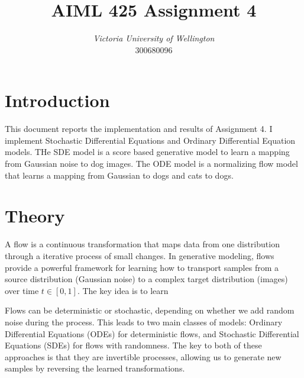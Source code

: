 \documentclass[conference,a4paper]{IEEEtran}
\begin{document}
\title{AIML 425 Assignment 4 %
}

\author{
\textit{Victoria University of Wellington}\\
300680096}


\maketitle

\section{Introduction}

This document reports the implementation and results of Assignment 4. I implement Stochastic Differential Equations and Ordinary Differential Equation models. THe SDE model is a score based generative model to learn a mapping from Gaussian noise to dog images. The ODE model is a normalizing flow model that learns a mapping from Gaussian to dogs and cats to dogs.

\section{Theory}

A flow is a continuous transformation that maps data from one distribution through a iterative process of small changes. In generative modeling, flows provide a powerful framework for learning how to transport samples from a source distribution (Gaussian noise) to a complex target distribution (images) over time $t \in [0, 1]$. The key idea is to learn 

Flows can be deterministic or stochastic, depending on whether we add random noise during the process. This leads to two main classes of models: Ordinary Differential Equations (ODEs) for deterministic flows, and Stochastic Differential Equations (SDEs) for flows with randomness. The key to both of these approaches is that they are invertible processes, allowing us to generate new samples by reversing the learned transformations.
\end{document}
